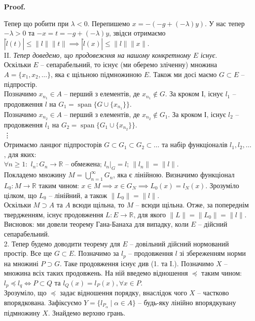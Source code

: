 \documentclass[a4paper, 10pt]{article}
\makeatletter
\theoremstyle{theoremdd}
\theoremstyle{theoremdd}
\theoremstyle{theoremdd}
\theoremstyle{theoremdd}
\theoremstyle{theoremdd}
\theoremstyle{theoremdd}
\theoremstyle{theoremdd}
\theoremstyle{theoremdd}
\renewenvironment{proof}[1][Proof.\\]{\par
\pushQED{\hfill \qed}%
\normalfont \topsep6\p@\@plus6\p@\relax
\trivlist
\item\relax
{\bfseries
#1\@addpunct{.}}\hspace\labelsep\ignorespaces
}{%
\popQED\endtrivlist\@endpefalse
}
\DeclareMathOperator{\linspan}{span}
\makeatother
\begin{document}
\begin{proof}
Тепер що робити при $\lambda < 0$. Перепишемо $x = -(-g + (-\lambda)y)$. У нас тепер $-\lambda > 0$ та $-x = t = -g + (-\lambda)y$, звідси отримаємо\\
$|\tilde{l}(t)| \leq \|l\| \|t\| \implies |\tilde{l}(x)| \leq \|l\| \|x\|$.
\bigskip \\
II. \textit{Тепер доведемо, що продовежння на нашому конкретному $E$ існує}.\\
Оскільки $E$ -- сепарабельний, то існує (ми оберемо зліченну) множина $A = \{x_1,x_2,\dots\}$, яка є щільною підмножиною $E$. Також ми досі маємо $G \subset E$ -- підпростір.\\
Позначимо $x_{n_1} \in A$ -- перший з елементів, де $x_{n_1} \notin G$. За кроком І, існує $l_1$ -- продовження $l$ на $G_1 = \linspan\{G \cup \{x_{n_1}\}\}$.\\
Позначимо $x_{n_2} \in A$ -- перший з елементів, де $x_{n_2} \notin G_1$. За кроком І, існує $l_2$ -- продовження $l_1$ на $G_2 = \linspan\{G_1 \cup \{x_{n_2}\}\}$.\\
\vdots \\
Отримаємо ланцюг підпросторів $G \subset G_1 \subset G_2 \subset \dots$ та набір функціоналів $l_1,l_2,\dots$, для яких:\\
$\forall n \geq 1:$ \qquad $l_n \colon G_n \to \mathbb{R}$ -- обмежена; \qquad $l_n|_G = l$; \qquad $\|l_n\| = \|l\|$.\\
Покладемо множину $M = \displaystyle\bigcup_{n=1}^\infty G_n$, яка є лінійною. Визначимо функціонал $L_0 \colon M \to \mathbb{R}$ таким чином: $x \in M \implies x \in G_N \implies L_0(x) = l_N(x)$. Зрозуміло цілком, що $L_0$ -- лінійний, а також $\|L_0\| = \|l\|$.\\
Оскільки $M \supset A$ та $A$ всюди щільна, то $M$ -- всюди щільна. Отже, за попереднім твердженням, існує продовження $L \colon E \to \mathbb{R}$, для якого $\|L\| = \|L_0\| = \|l\|$.\\
Висновок: ми довели теорему Гана-Банаха для випадку, коли $E$ -- дійсний сепарабельний.
\bigskip \\
2. Тепер будемо доводити теорему для $E$ -- довільний дійсний нормований простір. Все ще $G \subset E$. Позначимо за $l_p$ -- продовження $l$  зі збереженням норми на множині $P \supset G$. Таке продовження існує див (1. та I.). Позначимо $X$ -- множина всіх таких продовжень. На ній введемо відношення $\preceq$ таким чином:\\
$l_p \preceq l_q \iff P \subset Q$ та $l_Q(x) = l_P(x), \forall x \in P$.\\
Зрозуміло, що $\preceq$ задає відношення порядку, внаслідок чого $X$ -- частково впорядкована. Зафіксуємо $Y = \{l_{P_\alpha} \mid \alpha \in A\}$ -- будь-яку лінійно впорядкувану підмножину $X$. Знайдемо верхню грань.\\

\end{proof}
\end{document}
